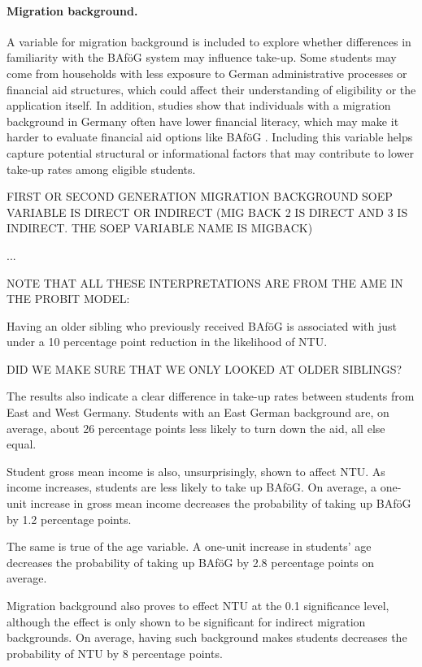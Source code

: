 \paragraph{Migration background.} A variable for migration background is included to explore whether differences in familiarity with the BAföG system may influence take-up. Some students may come from households with less exposure to German administrative processes or financial aid structures, which could affect their understanding of eligibility or the application itself. In addition, studies show that individuals with a migration background in Germany often have lower financial literacy, which may make it harder to evaluate financial aid options like BAföG \citep{Tsegay_2024}. Including this variable helps capture potential structural or informational factors that may contribute to lower take-up rates among eligible students. 

FIRST OR SECOND GENERATION MIGRATION BACKGROUND SOEP VARIABLE IS DIRECT OR INDIRECT (MIG BACK 2 IS DIRECT AND 3 IS INDIRECT. THE SOEP VARIABLE NAME IS MIGBACK)

...

NOTE THAT ALL THESE INTERPRETATIONS ARE FROM THE AME IN THE PROBIT MODEL:

Having an older sibling who previously received BAföG is associated with just under a 10 percentage point reduction in the likelihood of NTU.

DID WE MAKE SURE THAT WE ONLY LOOKED AT OLDER SIBLINGS?

The results also indicate a clear difference in take-up rates between students from East and West Germany. Students with an East German background are, on average, about 26 percentage points less likely to turn down the aid, all else equal.

Student gross mean income is also, unsurprisingly, shown to affect NTU. As income increases, students are less likely to take up BAföG. On average, a one-unit increase in gross mean income decreases the probability of taking up BAföG by 1.2 percentage points.

The same is true of the age variable. A one-unit increase in students' age decreases the probability of taking up BAföG by 2.8 percentage points on average.

Migration background also proves to effect NTU at the 0.1 significance level, although the effect is only shown to be significant for indirect migration backgrounds. On average, having such background makes students decreases the probability of NTU by 8 percentage points.

